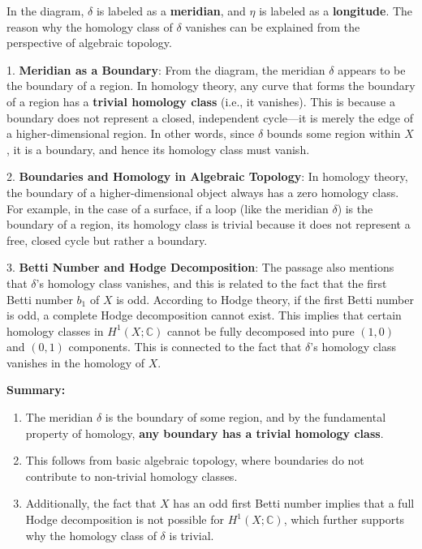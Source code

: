 \documentclass[lang=en,12pt]{beautybook}
\begin{document}
\begin{remark}
  \upshape
  In the diagram, $\delta$ is labeled as a \textbf{meridian}, and $\eta$ is labeled as a \textbf{longitude}. The reason why the homology class of $\delta$ vanishes can be explained from the perspective of algebraic topology.

  1. \textbf{Meridian as a Boundary}:
  From the diagram, the meridian $\delta$ appears to be the boundary of a region. In homology theory, any curve that forms the boundary of a region has a \textbf{trivial homology class} (i.e., it vanishes). This is because a boundary does not represent a closed, independent cycle—it is merely the edge of a higher-dimensional region. In other words, since $\delta$ bounds some region within $X$, it is a boundary, and hence its homology class must vanish.

  2. \textbf{Boundaries and Homology in Algebraic Topology}:
  In homology theory, the boundary of a higher-dimensional object always has a zero homology class. For example, in the case of a surface, if a loop (like the meridian $\delta$) is the boundary of a region, its homology class is trivial because it does not represent a free, closed cycle but rather a boundary.

  3. \textbf{Betti Number and Hodge Decomposition}:
  The passage also mentions that $\delta$'s homology class vanishes, and this is related to the fact that the first Betti number $b_1$ of $X$ is odd. According to Hodge theory, if the first Betti number is odd, a complete Hodge decomposition cannot exist. This implies that certain homology classes in $H^1(X;\mathbb{C})$ cannot be fully decomposed into pure $(1,0)$ and $(0,1)$ components. This is connected to the fact that $\delta$'s homology class vanishes in the homology of $X$.

  \textbf{Summary:}\begin{enumerate}
    \item The meridian $\delta$ is the boundary of some region, and by the fundamental property of homology, \textbf{any boundary has a trivial homology class}.
    \item This follows from basic algebraic topology, where boundaries do not contribute to non-trivial homology classes.
    \item Additionally, the fact that $X$ has an odd first Betti number implies that a full Hodge decomposition is not possible for $H^1(X;\mathbb{C})$, which further supports why the homology class of $\delta$ is trivial.
  \end{enumerate}
\end{remark}
\end{document}
